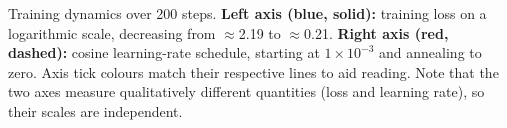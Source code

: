 \caption{Training dynamics over 200 steps. \textbf{Left axis (blue, solid):} training loss on a logarithmic scale, decreasing from $\approx$2.19 to $\approx$0.21. \textbf{Right axis (red, dashed):} cosine learning-rate schedule, starting at $1\times10^{-3}$ and annealing to zero. Axis tick colours match their respective lines to aid reading. Note that the two axes measure qualitatively different quantities (loss and learning rate), so their scales are independent.}
